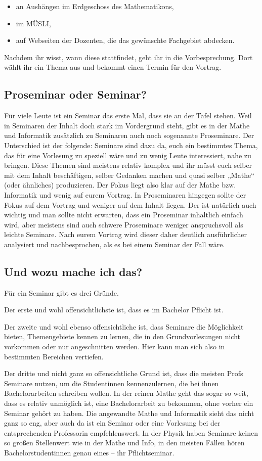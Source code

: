 \begin{itemize}
	\item an Aushängen im Erdgeschoss des Mathematikons,
	\item im MÜSLI,
	\item auf Webseiten der Dozenten, die das gewünschte Fachgebiet abdecken.
\end{itemize}

Nachdem ihr wisst, wann diese stattfindet, geht ihr in die Vorbesprechung. Dort wählt ihr ein Thema aus und bekommt einen Termin für den Vortrag.

\subsection{Proseminar oder Seminar?}
Für viele Leute ist ein Seminar das erste Mal, dass sie an der Tafel stehen.  Weil in Seminaren der Inhalt doch stark im Vordergrund steht, gibt es in der Mathe und Informatik zusätzlich zu Seminaren auch noch sogenannte Proseminare. Der Unterschied ist der folgende: Seminare sind dazu da, euch ein bestimmtes Thema, das für eine Vorlesung zu speziell wäre und zu wenig Leute interessiert, nahe zu bringen. Diese Themen sind meistens relativ komplex und ihr müsst euch selber mit dem Inhalt beschäftigen, selber Gedanken machen und quasi selber „Mathe“ (oder ähnliches) produzieren. Der Fokus liegt also klar auf der Mathe bzw. Informatik und wenig auf eurem Vortrag. In Proseminaren hingegen sollte der Fokus auf dem Vortrag und weniger auf dem Inhalt liegen. Der ist natürlich auch wichtig und man sollte nicht erwarten, dass ein Proseminar inhaltlich einfach wird, aber meistens sind auch schwere Proseminare weniger anspruchsvoll als leichte Seminare. Nach eurem Vortrag wird dieser daher deutlich ausführlicher analysiert und nachbesprochen, als es bei einem Seminar der Fall wäre.

\subsection{Und wozu mache ich das?}
Für ein Seminar gibt es drei Gründe.

Der erste und wohl offensichtlichste ist, dass es im Bachelor Pflicht ist.

Der zweite und wohl ebenso offensichtliche ist, dass Seminare die Möglichkeit bieten, Themengebiete kennen zu lernen, die in den Grundvorlesungen nicht vorkommen oder nur angeschnitten werden. Hier kann man sich also in bestimmten Bereichen vertiefen.

Der dritte und nicht ganz so offensichtliche Grund ist, dass die meisten Profs Seminare nutzen, um die Studentinnen kennenzulernen, die bei ihnen Bachelorarbeiten schreiben wollen. In der reinen Mathe geht das sogar so weit, dass es relativ unmöglich ist, eine Bachelorarbeit zu bekommen, ohne vorher ein Seminar gehört zu haben. Die angewandte Mathe und Informatik sieht das nicht ganz so eng, aber auch da ist ein Seminar oder eine Vorlesung bei der entsprechenden Professorin empfehlenswert. In der Physik haben Seminare keinen so großen Stellenwert wie in der Mathe und Info, in den meisten Fällen hören Bachelorstudentinnen genau eines -- ihr Pflichtseminar. 
